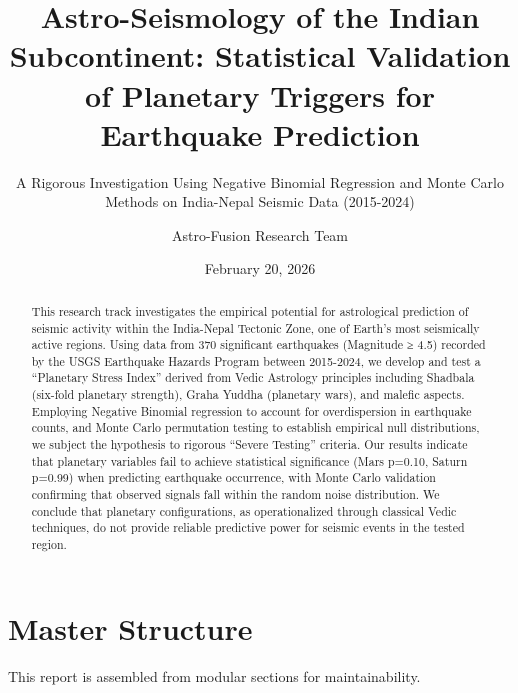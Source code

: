 \documentclass[
  11pt,
  a4paper,
  oneside,
  openany]{article}
\title{Astro-Seismology of the Indian Subcontinent: Statistical
Validation of Planetary Triggers for Earthquake Prediction}
\subtitle{A Rigorous Investigation Using Negative Binomial Regression
and Monte Carlo Methods on India-Nepal Seismic Data (2015-2024)}
\author{Astro-Fusion Research Team}
\date{February 20, 2026}
\renewcommand*\contentsname{Table of contents}
\newcommand\contentsname{Table of contents}
\begin{document}
\maketitle
\begin{abstract}
This research track investigates the empirical potential for
astrological prediction of seismic activity within the India-Nepal
Tectonic Zone, one of Earth's most seismically active regions. Using
data from 370 significant earthquakes (Magnitude ≥ 4.5) recorded by the
USGS Earthquake Hazards Program between 2015-2024, we develop and test a
``Planetary Stress Index'' derived from Vedic Astrology principles
including Shadbala (six-fold planetary strength), Graha Yuddha
(planetary wars), and malefic aspects. Employing Negative Binomial
regression to account for overdispersion in earthquake counts, and Monte
Carlo permutation testing to establish empirical null distributions, we
subject the hypothesis to rigorous ``Severe Testing'' criteria. Our
results indicate that planetary variables fail to achieve statistical
significance (Mars p=0.10, Saturn p=0.99) when predicting earthquake
occurrence, with Monte Carlo validation confirming that observed signals
fall within the random noise distribution. We conclude that planetary
configurations, as operationalized through classical Vedic techniques,
do not provide reliable predictive power for seismic events in the
tested region.
\end{abstract}

\renewcommand*\contentsname{Table of contents}
{
\hypersetup{linkcolor=}
\setcounter{tocdepth}{3}
\tableofcontents
}
\listoffigures
\listoftables
{}
\section{Master Structure}\label{master-structure}

\begin{tcolorbox}[enhanced jigsaw, breakable, opacitybacktitle=0.6, bottomtitle=1mm, toptitle=1mm, leftrule=.75mm, toprule=.15mm, title=\textcolor{quarto-callout-note-color}{\faInfo}\hspace{0.5em}{Note}, arc=.35mm, opacityback=0, colframe=quarto-callout-note-color-frame, colback=white, left=2mm, titlerule=0mm, rightrule=.15mm, bottomrule=.15mm, coltitle=black, colbacktitle=quarto-callout-note-color!10!white]

This report is assembled from modular sections for maintainability.

\end{tcolorbox}
\end{document}
